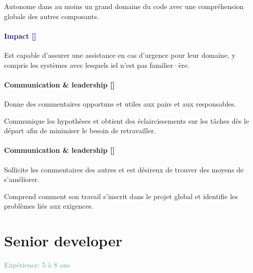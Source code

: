 \documentclass[a4paper, french, openany, 12pt]{book}
\newcommand\wis{\textcolor{MidnightBlue}{\textbf{Impact [\bsc{WIS}]}}}
\newcommand\cha{\textcolor{RawSienna}{\textbf{Communication \& leadership [\bsc{CHA}]}}}
\newcommand\xp[1]{\textcolor{CadetBlue}{Expérience: {#1} ans}}
\begin{document}
\begin{multicols}{2}
  Autonome dans au moins un grand domaine du code avec une compréhension globale des autres composants.

  \subsubsection*{\wis}

  Est capable d'assurer une assistance en cas d'urgence pour leur domaine, y compris les systèmes avec lesquels iel 
  n'est pas familier·ère.

  \subsubsection*{\cha}

  Donne des commentaires opportuns et utiles aux pairs et aux responsables.

  Communique les hypothèses et obtient des éclaircissements sur les tâches dès le départ afin de minimiser le besoin de 
  retravailler.

  \subsubsection*{\cha}

  Sollicite les commentaires des autres et est désireux de trouver des moyens de s'améliorer.

  Comprend comment son travail s'inscrit dans le projet global et identifie les problèmes liés aux exigences.

\end{multicols}

\chapter{Senior developer}

\xp{5 à 8}
\end{document}
